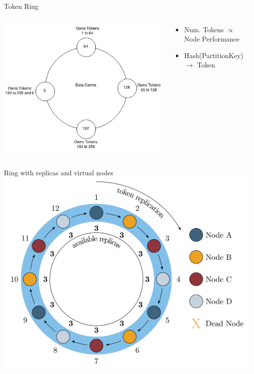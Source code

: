 \documentclass[
  10pt
]{beamer}
\begin{document}
\begin{frame}{Token Ring}
  \begin{columns}
    \begin{column}{0.5\textwidth}
    \includegraphics[width=\columnwidth]{resources/token_ring.jpg}
    \end{column}
    \begin{column}{0.5\textwidth}
      \begin{itemize}
        \item Num. Tokens $\propto$ Node Performance
        \item Hash(PartitionKey) \\ $\rightarrow$ Token
      \end{itemize}
    \end{column}
  \end{columns}
\end{frame}

\begin{frame}{Ring with replicas and virtual nodes}
  \includegraphics[width=1.0\textwidth]{resources/replica_ring.png}
\end{frame}
\end{document}
